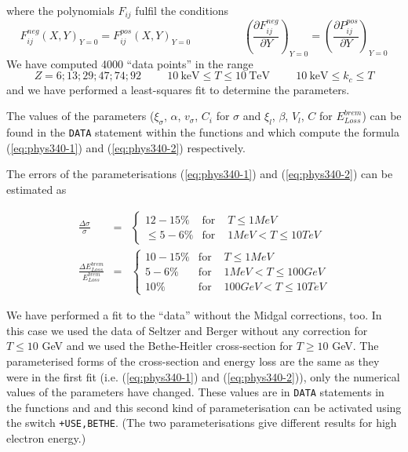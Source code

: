 where the polynomials $F_{ij}$ fulfil the conditions
\[
F_{ij}^{neg}(X,Y)_{Y=0} = F_{ij}^{pos}(X,Y)_{Y=0}   \hspace{2cm}
\left ( \frac{\partial F_{ij}^{neg}}{\partial Y} \right )_{Y=0} =
\left ( \frac{\partial P_{ij}^{pos}}{\partial Y} \right )_{Y=0}
\]
We have computed 4000 ``data points'' in the range
\[
Z = 6  ;  13  ;  29  ;  47  ;  74  ;  92  \hspace{1cm}
10 \: \mbox{keV} \leq T \leq 10 \: \mbox{TeV}  \hspace{1cm}
10 \: \mbox{keV} \leq k_c \leq T  
\]
and we have performed a least-squares fit to determine the parameters.
 
The values of the parameters ($\xi_{\sigma}$, $\alpha$, 
$v_{\sigma}$, $C_i $ for $\sigma$ and
$\xi_l$, $\beta$, $V_l$, $C$ for $E_{Loss}^{brem}$) 
can be found in the {\tt DATA} 
statement within the functions
 and   which compute the formula (\ref{eq:phys340-1})
and (\ref{eq:phys340-2}) respectively.
 
The errors of the parameterisations (\ref{eq:phys340-1}) and (\ref{eq:phys340-2})
can be estimated as

\begin{eqnarray*}
\frac{\Delta\sigma} {\sigma} & = & \left \{
\begin{array}{llr} 
        12-15\%    & \mbox{for    } & T \leq 1 MeV \\
        \leq 5-6\% & \mbox{for    } & 1 MeV < T \leq 10 TeV
\end{array} 
\right . \\[1cm]
\frac{\Delta E_{Loss}^{brem}}
     {E_{Loss}^{brem}} & = & \left \{
\begin{array}{llr}
        10-15\%    & \mbox{for    } & T \leq1 MeV  \\
        5-6\%      & \mbox{for    } & 1 MeV < T \leq 100 GeV\\
        10\%       & \mbox{for    } & 100 GeV < T \leq10 TeV
\end{array} 
\right . 
\end{eqnarray*}

We have performed a fit to the ``data'' without the Midgal corrections, too.
In this case we used the data of Seltzer and Berger without any
correction for $T \leq 10$ GeV and we used the Bethe-Heitler cross-section
for $T \geq 10$ GeV. The parameterised forms of the cross-section and
energy loss are the same as they were in the first fit (i.e. (\ref{eq:phys340-1})
and (\ref{eq:phys340-2})), only the numerical values of the parameters 
have changed.
These values are in {\tt DATA} statements in the functions 
and  and this second kind of parameterisation can be activated
using the  switch {\tt +USE,BETHE}. (The two
parameterisations give different results for high electron energy.)

